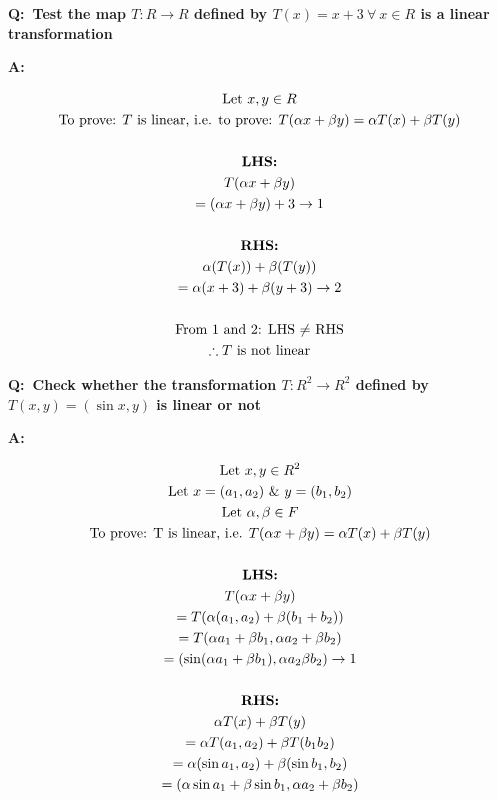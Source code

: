 \documentclass[english,course,fleqn]{lecture}
\newenvironment{qanda}{\setlength{\parindent}{0pt}}{\bigskip}
\newcommand{\Q}{\bigskip\bfseries Q:\ }
\newcommand{\A}{\par\textbf{A:} \normalfont}
\begin{document}
\begin{qanda}
	\Q Test the map $T:R\rightarrow R$ defined by $T(x) = x + 3 ~\forall~ x \in R$ is a linear transformation

	\A

	\begin{gather*}
		\text{Let }x,y \in R\\
		\text{To prove: $T$ is linear, i.e. to prove: $T(\alpha x + \beta y) = \alpha T(x) + \beta T(y)$}\\
		\\
		\text{\textbf{LHS:}}\\
		T(\alpha x + \beta y )\\
		= (\alpha x + \beta y) + 3 \rightarrow 1\\
		\\
		\text{\textbf{RHS:}}\\
		\alpha (T(x)) + \beta (T(y))\\
		= \alpha (x + 3) + \beta ( y + 3) \rightarrow 2\\
		\\
		\text{From $1$ and $2$: LHS $\ne$ RHS}\\
		\therefore \text{$T$ is not linear}
	\end{gather*}

	\Q Check whether the transformation $T:R^{2} \rightarrow R^{2}$ defined by $T(x,y) = (\sin x, y)$ is linear or not

	\A

	\begin{gather*}
		\text{Let $x,y \in R^{2}$}\\
		\text{Let $x = (a_{1}, a_{2})$ \& $y = (b_{1}, b_{2})$}\\
		\text{Let $\alpha, \beta \in F$}\\
		\text{To prove: T is linear, i.e. $T(\alpha x + \beta y) = \alpha T(x) + \beta T(y)$}\\
		\\
		\text{\textbf{LHS:}}\\
		T(\alpha x + \beta y)\\
		= T(\alpha (a_{1}, a_{2}) + \beta(b_{1} + b_{2}))\\
		= T(\alpha a_{1} + \beta b_{1}, \alpha a_{2} + \beta b_{2})\\
		= (\sin (\alpha a_{1} + \beta b_{1}), \alpha a_{2} \beta b_{2}) \rightarrow 1\\
		\\
		\text{\textbf{RHS:}}\\
		\alpha T(x) + \beta T(y)\\
		= \alpha T(a_{1}, a_{2}) + \beta T(b_{1} b_{2})\\
		= \alpha (\sin a_{1}, a_{2}) + \beta (\sin b_{1}, b_{2})\\
		= (\alpha \sin a_{1} + \beta \sin b_{1}, \alpha a_{2} + \beta b_{2})\\
	\end{gather*}


\end{qanda}
\end{document}
